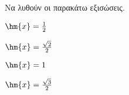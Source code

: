 Να λυθούν οι παρακάτω εξισώσεις.
\begin{multicols}{2}
\begin{alist}
\item $ \hm{x}=\frac{1}{2} $
\item $ \hm{x}=\frac{\sqrt{2}}{2} $
\item $ \hm{x}=1 $
\item $ \hm{x}=\frac{\sqrt{3}}{2} $
\end{alist}
\end{multicols}



